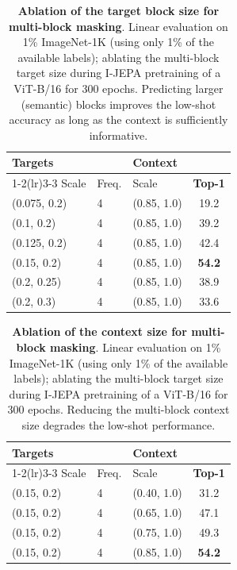 \documentclass[10pt,twocolumn,letterpaper]{article}
\newcommand{\putalg}{{I-JEPA}\xspace}
\begin{document}
\begin{table}[!t]
    \centering
    \begin{tabular}{l l l c}
    \multicolumn{2}{l}{\bf\small Targets} & \bf\small Context \\
    \cmidrule(lr){1-2}\cmidrule(lr){3-3}
    \small Scale & \small Freq. & \small Scale & \bf\small Top-1 \\
    \toprule
    \small (0.075, 0.2) &  4 & \small (0.85, 1.0) & 19.2 \\
    \small (0.1, 0.2) &  4 & \small (0.85, 1.0) &  39.2 \\
    \small (0.125, 0.2) &  4 & \small (0.85, 1.0) &  42.4 \\
    \small (0.15, 0.2) &  4 & \small (0.85, 1.0) & \bf 54.2 \\
    \small (0.2, 0.25) &  4 & \small (0.85, 1.0) &  38.9 \\
    \small (0.2, 0.3) &  4 & \small (0.85, 1.0) &  33.6 \\
    \end{tabular}
    \caption{\textbf{Ablation of the target block size for multi-block masking}.
    Linear evaluation on 1\% ImageNet-1K (using only 1\% of the available labels); ablating the multi-block target size during \putalg pretraining of a ViT-B/16 for 300 epochs. Predicting larger (semantic) blocks improves the low-shot accuracy as long as the context is sufficiently informative.}
    \label{tb:ablation-multiblock-targetsize}
\end{table}


\begin{table}[!t]
    \centering
    \begin{tabular}{l l l c}
    \multicolumn{2}{l}{\bf\small Targets} & \bf\small Context \\
    \cmidrule(lr){1-2}\cmidrule(lr){3-3}
    \small Scale & \small Freq. & \small Scale & \bf\small Top-1 \\
    \toprule
    \small (0.15, 0.2) &  4 & \small (0.40, 1.0) & 31.2 \\
    \small (0.15, 0.2) &  4 & \small (0.65, 1.0) & 47.1 \\
    \small (0.15, 0.2) &  4 & \small (0.75, 1.0) & 49.3 \\
    \small (0.15, 0.2) &  4 & \small (0.85, 1.0) & \bf 54.2 \\
    \end{tabular}
    \caption{\textbf{Ablation of the context size for multi-block masking}.
    Linear evaluation on 1\% ImageNet-1K (using only 1\% of the available labels); ablating the multi-block target size during \putalg pretraining of a ViT-B/16 for 300 epochs. Reducing the multi-block context size degrades the low-shot performance.}
    \label{tb:ablation-multiblock-contexsize}
\end{table}
\end{document}
